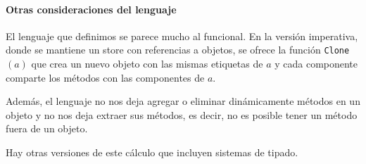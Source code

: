 \paragraph{Otras consideraciones del lenguaje}
El lenguaje que definimos se parece mucho al funcional. En la versión imperativa, donde se mantiene un store con referencias a objetos, se ofrece la función \texttt{Clone}$(a)$ que crea un nuevo objeto con las mismas etiquetas de $a$ y cada componente comparte los métodos con las componentes de $a$.

Además, el lenguaje no nos deja agregar o eliminar dinámicamente métodos en un objeto y no nos deja extraer sus métodos, es decir, no es posible tener un método fuera de un objeto.

Hay otras versiones de este cálculo que incluyen sistemas de tipado.
